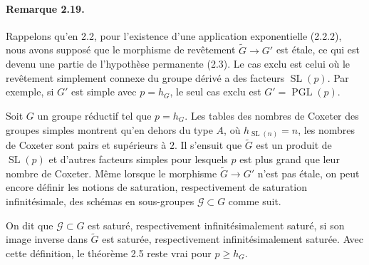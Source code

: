 \documentclass[11pt]{article}
\newcommand{\SL}{\operatorname{SL}}
\newcommand{\PGL}{\operatorname{PGL}}
\begin{document}
\paragraph{Remarque 2.19.}
Rappelons qu'en 2.2, pour l'existence d'une application exponentielle (2.2.2), nous
avons supposé que le morphisme de revêtement \(\widetilde G\to G'\) est étale, ce qui
est devenu une partie de l'hypothèse permanente (2.3). Le cas exclu est celui où le
revêtement simplement connexe du groupe dérivé a des facteurs \(\SL(p)\). Par exemple,
si \(G'\) est simple avec \(p=h_G\), le seul cas exclu est \(G'=\PGL(p)\).

Soit \(G\) un groupe réductif tel que \(p=h_G\). Les tables des nombres de Coxeter des
groupes simples montrent qu'en dehors du type \(A\), où \(h_{\SL(n)}=n\), les nombres
de Coxeter sont pairs et supérieurs à \(2\). Il s'ensuit que \(\widetilde G\) est un
produit de \(\SL(p)\) et d'autres facteurs simples pour lesquels \(p\) est plus grand que
leur nombre de Coxeter. Même lorsque le morphisme \(\widetilde G\to G'\) n'est pas
étale, on peut encore définir les notions de saturation, respectivement de saturation
infinitésimale, des schémas en sous-groupes \(\mathcal G\subset G\) comme suit.

On dit que \(\mathcal G\subset G\) est saturé, respectivement infinitésimalement saturé,
si son image inverse dans \(\widetilde G\) est saturée, respectivement infinitésimalement
saturée. Avec cette définition, le théorème 2.5 reste vrai pour \(p\ge h_G\).
\end{document}
